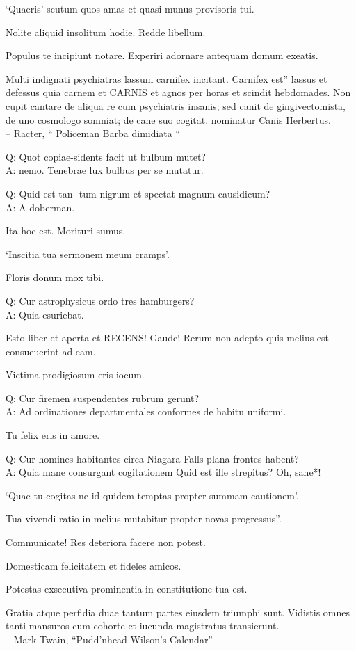 \documentclass[titlepage,12pt]{memoir}
\begin{document}
‘Quaeris’ scutum quos amas et quasi munus provisoris tui.

Nolite aliquid insolitum hodie. Redde libellum.

Populus te incipiunt notare. Experiri adornare antequam domum exeatis.

Multi indignati psychiatras lassum carnifex incitant. Carnifex est”
lassus et defessus quia carnem et CARNIS et agnos per horas et scindit
hebdomades. Non cupit cantare de aliqua re cum psychiatris insanis;
sed canit de gingivectomista, de uno cosmologo somniat;
de cane suo cogitat. nominatur Canis Herbertus.
\\-- Racter, “ Policeman Barba dimidiata “

Q: Quot copiae-sidents facit ut bulbum mutet?\\
A: nemo. Tenebrae lux bulbus per se mutatur.

Q: Quid est tan- tum nigrum et spectat magnum causidicum?\\
A: A doberman.

Ita hoc est. Morituri sumus.

‘Inscitia tua sermonem meum cramps’.

Floris donum mox tibi.

Q: Cur astrophysicus ordo tres hamburgers?\\
A: Quia esuriebat.

Esto liber et aperta et RECENS! Gaude! Rerum non adepto quis melius est
consueuerint ad eam.

Victima prodigiosum eris iocum.

Q: Cur firemen suspendentes rubrum gerunt?\\
A: Ad ordinationes departmentales conformes de habitu uniformi.

Tu felix eris in amore.

Q: Cur homines habitantes circa Niagara Falls plana frontes habent?\\
A: Quia mane consurgant cogitationem Quid est ille strepitus?
Oh, sane*!

‘Quae tu cogitas ne id quidem temptas propter summam cautionem’.

Tua vivendi ratio in melius mutabitur propter novas progressus”.

Communicate! Res deteriora facere non potest.

 Domesticam felicitatem et fideles amicos.

Potestas exsecutiva prominentia in constitutione tua est.

 Gratia atque perfidia duae tantum partes eiusdem triumphi sunt.
Vidistis omnes tanti mansuros cum cohorte et iucunda
magistratus transierunt.
\\-- Mark Twain, “Pudd’nhead Wilson’s Calendar”
\end{document}

